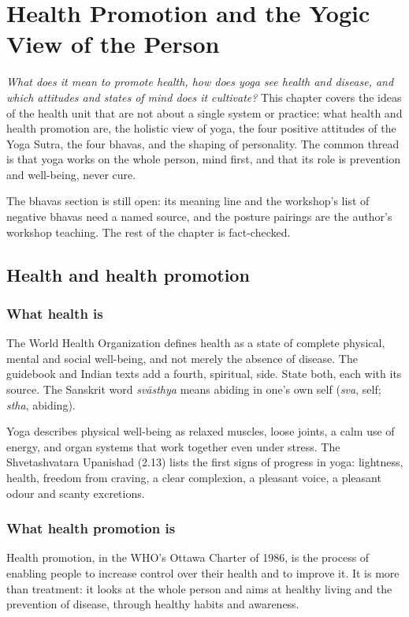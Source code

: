 \chapter{Health Promotion and the Yogic View of the Person}
\label{ch:health-promotion}

\emph{What does it mean to promote health, how does yoga see health and disease, and which attitudes and states of mind does it cultivate?}
This chapter covers the ideas of the health unit that are not about a single system or practice: what health and health promotion are, the holistic view of yoga, the four positive attitudes of the Yoga Sutra, the four bhavas, and the shaping of personality. The common thread is that yoga works on the whole person, mind first, and that its role is prevention and well-being, never cure.

\begin{unverified}
The bhavas section is still open: its meaning line and the workshop's list of negative bhavas need a named source, and the posture pairings are the author's workshop teaching. The rest of the chapter is fact-checked.
\end{unverified}

\section{Health and health promotion}

\subsection*{What health is}
The World Health Organization defines health as a state of complete physical, mental and social well-being, and not merely the absence of disease. The guidebook and Indian texts add a fourth, spiritual, side. State both, each with its source. The Sanskrit word \emph{svāsthya} means abiding in one's own self (\emph{sva}, self; \emph{stha}, abiding).

Yoga describes physical well-being as relaxed muscles, loose joints, a calm use of energy, and organ systems that work together even under stress. The Shvetashvatara Upanishad (2.13) lists the first signs of progress in yoga: lightness, health, freedom from craving, a clear complexion, a pleasant voice, a pleasant odour and scanty excretions.

\subsection*{What health promotion is}
Health promotion, in the WHO's Ottawa Charter of 1986, is the process of enabling people to increase control over their health and to improve it. It is more than treatment: it looks at the whole person and aims at healthy living and the prevention of disease, through healthy habits and awareness.

